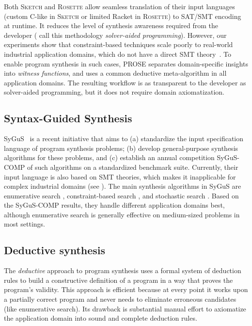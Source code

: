 Both \textsc{Sketch} and \textsc{Rosette} allow seamless translation of their input languages (custom C-like in
\textsc{Sketch} or limited Racket in \textsc{Rosette}) to SAT/SMT encoding at runtime.
It reduces the level of synthesis awareness required from the developer (\citeauthor{rosette} call this methodology
\emph{solver-aided programming}).
However, our experiments show that constraint-based techniques scale poorly to real-world industrial application
domains, which do not have a direct SMT theory~\cite{andersen:procedural,singh2012synthesizing}.
To enable program synthesis in such cases, PROSE separates domain-specific insights into \emph{witness
functions}, and uses a common deductive meta-algorithm in all application domains.
The resulting workflow is as transparent to the developer as solver-aided programming, but it does not require domain
axiomatization.

\subsection{Syntax-Guided Synthesis}
SyGuS~\cite{sygus} is a recent initiative that aims to (a) standardize the input specification language of program
synthesis problems;
(b) develop general-purpose synthesis algorithms for these problems, and
(c) establish an annual competition SyGuS-COMP of such algorithms on a standardized benchmark suite.
Currently, their input language is also based on SMT theories, which makes it inapplicable for complex industrial
domains (see ).
The main synthesis algorithms in SyGuS are enumerative search \cite{transit:protocols}, constraint-based search
\cite{bitvectors}, and stochastic search \cite{schkufza2013stochastic}.
Based on the SyGuS-COMP results, they handle different application domains best, although enumerative search is
generally effective on medium-sized problems in most settings.

\subsection{Deductive synthesis}
The \emph{deductive} approach to program synthesis \cite{manna1980deductive} uses a formal system of deduction rules to
build a constructive definition of a program in a way that proves the program's validity.
This approach is efficient because at every point it works upon a partially correct program and never needs to eliminate
erroneous candidates (like enumerative search).
Its drawback is substantial manual effort to axiomatize the application domain into sound and complete deduction rules.

